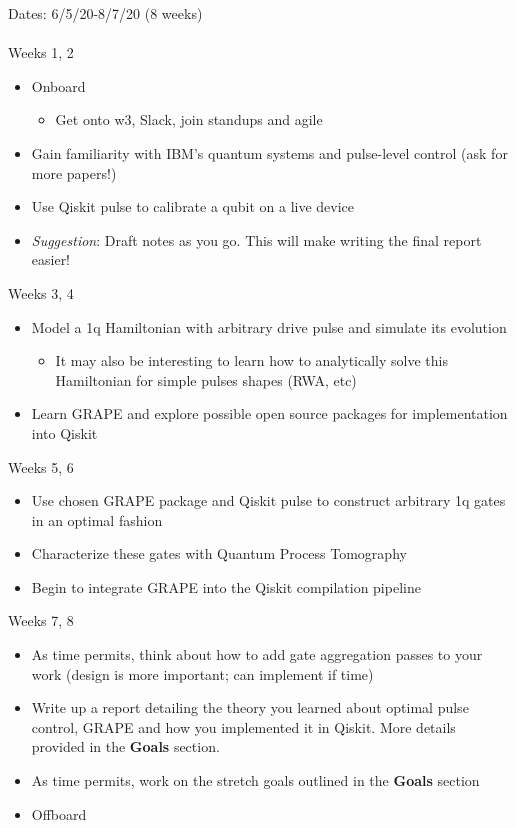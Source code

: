 \documentclass[11pt, letterpaper]{article}
\begin{document}
Dates: 6/5/20-8/7/20 (8 weeks) \\
\\
%
Weeks 1, 2
\begin{itemize}
\item Onboard
	\begin{itemize}
		\item Get onto w3, Slack, join standups and agile
	\end{itemize}
\item Gain familiarity with IBM's quantum systems and pulse-level control (ask for more papers!)
\item Use Qiskit pulse to calibrate a qubit on a live device
\item \textit{Suggestion}: Draft notes as you go. This will make writing the final report easier!
\end{itemize}
Weeks 3, 4
\begin{itemize}
\item Model a 1q Hamiltonian with arbitrary drive pulse and simulate its evolution
	\begin{itemize}
		\item It may also be interesting to learn how to analytically solve this Hamiltonian for simple pulses shapes (RWA, etc)
	\end{itemize}
\item Learn GRAPE and explore possible open source packages for implementation into Qiskit
\end{itemize}
Weeks 5, 6
\begin{itemize}
\item Use chosen GRAPE package and Qiskit pulse to construct arbitrary 1q gates in an optimal fashion
\item Characterize these gates with Quantum Process Tomography
\item Begin to integrate GRAPE into the Qiskit compilation pipeline
\end{itemize}
Weeks 7, 8
\begin{itemize}
\item As time permits, think about how to add gate aggregation passes \cite{shiOptimizedCompilationAggregated2019b} to your work (design is more important; can implement if time)
\item Write up a report detailing the theory you learned about optimal pulse control, GRAPE and how you implemented it in Qiskit. More details provided in the \textbf{Goals} section.
\item As time permits, work on the stretch goals outlined in the \textbf{Goals} section
\item Offboard
\end{itemize}





\end{document}

